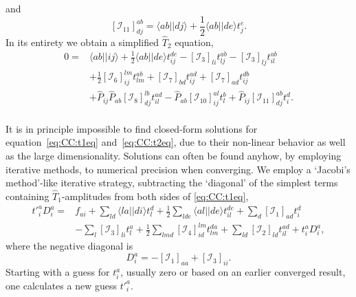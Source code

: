 and	
\begin{equation}
\left[\mathcal{I}_{11}\right]_{dj}^{ab} 
=
\langle ab || dj \rangle + \frac{1}{2} \langle ab||de \rangle t_j^e .
\end{equation}
In its entirety we obtain a simplified $\hat{T}_2$ equation,
\begin{equation}
\label{eq:CC:t2eq}
\begin{split}
0
=&
\langle ab || ij \rangle
+ \frac{1}{2} \langle ab||de \rangle t_{ij}^{de}
-  \left[\mathcal{I}_3\right]_{li} t_{lj}^{ab}
-  \left[\mathcal{I}_3\right]_{lj} t_{il}^{ab}
\\
&
+  \frac{1}{2} \left[\mathcal{I}_6\right]_{ij}^{lm}  t_{lm}^{ab}
+  \left[\mathcal{I}_7\right]_{bd} t_{ij}^{ad} 
+ \left[\mathcal{I}_7\right]_{ad} t_{ij}^{db} 
\\
&
+\hat{P}_{ij} \hat{P}_{ab} \left[\mathcal{I}_8\right]_{dj}^{lb} t_{il}^{ad}
-\hat{P}_{ab} \left[\mathcal{I}_{10}\right]_{ij}^{al} t_l^b
+ \hat{P}_{ij} \left[\mathcal{I}_{11}\right]_{dj}^{ab} t_i^d .
\end{split}
\end{equation}


\paragraph*{}
It is in principle impossible to find closed-form solutions for equation~\eqref{eq:CC:t1eq} and~\eqref{eq:CC:t2eq}, due to their non-linear behavior as well as the large dimensionality.
Solutions can often be found anyhow, by employing iterative methods, to numerical precision when converging.
We employ a `Jacobi's method'-like iterative strategy, subtracting the `diagonal' of the simplest terms containing $\hat{T}_1$-amplitudes from both sides of \eqref{eq:CC:t1eq},
\begin{equation}
\begin{split}
\label{eq:CC:t1_iteration}
\left.t'\right._i^a D_i^a =& f_{ai}
 + \sum_{ld}  \langle la||di \rangle t_l^d  + \frac{1}{2} \sum_{lde} \langle al||de \rangle t_{il}^{de} 
+ \sum_d  \left[\mathcal{I}_1\right]_{ad}  t_i^d   
\\
&- \sum_l \left[\mathcal{I}_3\right]_{li} t_l^a 
+ \frac{1}{2} \sum_{lmd} \left[\mathcal{I}_4\right]_{id}^{lm} t_{lm}^{da}
+ \sum_{ld} \left[\mathcal{I}_2\right]_{ld} t_{il}^{ad}
+ t_i^a D_i^a,
\end{split}
\end{equation}
where the negative diagonal is
\begin{equation}
D_{i}^{a} =  - \left[\mathcal{I}_1\right]_{aa} + \left[\mathcal{I}_3\right]_{ii}.
\end{equation}
Starting with a guess for $t_i^a$, usually zero or based on an earlier converged result, one calculates a new guess $\left. t' \right._i^a$.


